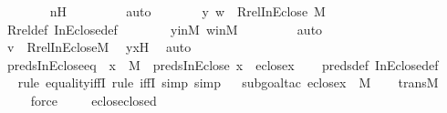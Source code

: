 \begin{isabellebody}
\ \ \ \ \ \ \isamarkupfalse%
\ nH\ \isanewline
\ \ \ \ \ \ \isamarkupfalse%
\ auto\isanewline
\ \ \ \ \isamarkupfalse%
\ \isamarkupfalse%
\ {\isachardoublequoteopen}{\isacharless}{\kern0pt}y{\isacharcomma}{\kern0pt}\ w{\isachargreater}{\kern0pt}\ {\isasymin}\ Rrel{\isacharparenleft}{\kern0pt}InEclose{\isacharcomma}{\kern0pt}\ M{\isacharparenright}{\kern0pt}{\isachardoublequoteclose}\ \isanewline
\ \ \ \ \ \ \isamarkupfalse%
\ Rrel{\isacharunderscore}{\kern0pt}def\ InEclose{\isacharunderscore}{\kern0pt}def\isanewline
\ \ \ \ \ \ \isamarkupfalse%
\ yinM\ winM\ \isanewline
\ \ \ \ \ \ \isamarkupfalse%
\ auto\isanewline
\ \ \isamarkupfalse%
\isanewline
\ \ \isamarkupfalse%
\ \isamarkupfalse%
\ {\isachardoublequoteopen}v\ {\isasymin}\ Rrel{\isacharparenleft}{\kern0pt}InEclose{\isacharcomma}{\kern0pt}M{\isacharparenright}{\kern0pt}{\isachardoublequoteclose}\ \isamarkupfalse%
\ yxH\ \isamarkupfalse%
\ auto\isanewline
{}\isamarkupfalse%
%
\endisatagproof
{\isafoldproof}%
%
\isadelimproof
\isanewline
%
\endisadelimproof
\isanewline
{}\isamarkupfalse%
\ preds{\isacharunderscore}{\kern0pt}InEclose{\isacharunderscore}{\kern0pt}eq\ {\isacharcolon}{\kern0pt}\ {\isachardoublequoteopen}x\ {\isasymin}\ M\ {\isasymLongrightarrow}\ preds{\isacharparenleft}{\kern0pt}InEclose{\isacharcomma}{\kern0pt}\ x{\isacharparenright}{\kern0pt}\ {\isacharequal}{\kern0pt}\ eclose{\isacharparenleft}{\kern0pt}x{\isacharparenright}{\kern0pt}{\isachardoublequoteclose}\isanewline
%
\isadelimproof
\ \ %
\endisadelimproof
%
\isatagproof
{}\isamarkupfalse%
\ preds{\isacharunderscore}{\kern0pt}def\ InEclose{\isacharunderscore}{\kern0pt}def\ \isanewline
\ \ \isamarkupfalse%
{\isacharparenleft}{\kern0pt}rule\ equality{\isacharunderscore}{\kern0pt}iffI{\isacharcomma}{\kern0pt}\ rule\ iffI{\isacharcomma}{\kern0pt}\ simp{\isacharcomma}{\kern0pt}\ simp{\isacharparenright}{\kern0pt}\isanewline
\ \ \isamarkupfalse%
{\isacharparenleft}{\kern0pt}subgoal{\isacharunderscore}{\kern0pt}tac\ {\isachardoublequoteopen}eclose{\isacharparenleft}{\kern0pt}x{\isacharparenright}{\kern0pt}\ {\isasymin}\ M{\isachardoublequoteclose}{\isacharparenright}{\kern0pt}\isanewline
\ \ \isamarkupfalse%
\ transM\ \isanewline
\ \ \ \isamarkupfalse%
\ force\ \isanewline
\ \ \isamarkupfalse%
\ eclose{\isacharunderscore}{\kern0pt}closed\ \isanewline

\end{isabellebody}

